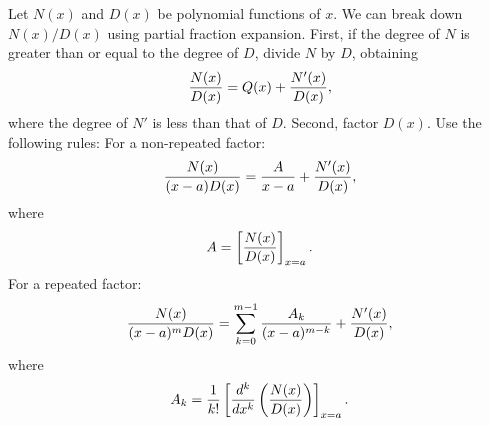 Let $N(x)$ and $D(x)$ be polynomial functions of $x$.
We can break down $N(x)/D(x)$ using partial fraction expansion.
First,
if the degree of $N$ is greater than or equal to the degree of $D$,
divide $N$ by $D$,
obtaining
$$
{N(x) \over D(x)} = Q(x) + {N'(x) \over D(x)},
$$
where the degree of $N'$ is less than that of $D$.
Second,
factor $D(x)$.
Use the following rules:
For a non-repeated factor:
$$
{N(x) \over (x-a) D(x)} = {A \over x-a} + {N'(x) \over D(x)},
$$
where
$$
A = \left[{N(x) \over D(x)}\right]_{x=a}.
$$
For a repeated factor:
$$
{N(x) \over (x-a)^m D(x)} = \sum_{k=0}^{m-1}{A_k \over (x-a)^{m-k}} + {N'(x) \over D(x)},
$$
where
$$
A_k = {1 \over k!}\left[{d^k \over dx^k} \left({N(x) \over D(x)}\right)\right]_{x=a}.
$$
